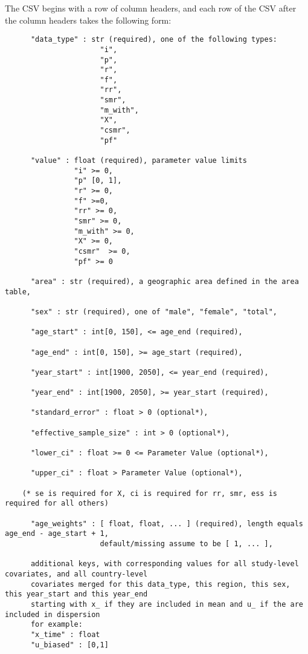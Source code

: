 The CSV begins with a row of column headers, and each row of the CSV after the column headers takes the following form:
\begin{verbatim}
      "data_type" : str (required), one of the following types:
                      "i",
                      "p",
                      "r",
                      "f",
                      "rr",
                      "smr",
                      "m_with",
                      "X",
                      "csmr",
                      "pf"

      "value" : float (required), parameter value limits
                "i" >= 0,
                "p" [0, 1],
                "r" >= 0,
                "f" >=0,
                "rr" >= 0,
                "smr" >= 0,
                "m_with" >= 0,
                "X" >= 0,
                "csmr"  >= 0,
                "pf" >= 0

      "area" : str (required), a geographic area defined in the area table,

      "sex" : str (required), one of "male", "female", "total",

      "age_start" : int[0, 150], <= age_end (required),

      "age_end" : int[0, 150], >= age_start (required),

      "year_start" : int[1900, 2050], <= year_end (required),

      "year_end" : int[1900, 2050], >= year_start (required),

      "standard_error" : float > 0 (optional*),

      "effective_sample_size" : int > 0 (optional*),

      "lower_ci" : float >= 0 <= Parameter Value (optional*),
      
      "upper_ci" : float > Parameter Value (optional*),

    (* se is required for X, ci is required for rr, smr, ess is required for all others)

      "age_weights" : [ float, float, ... ] (required), length equals age_end - age_start + 1,
                      default/missing assume to be [ 1, ... ],

      additional keys, with corresponding values for all study-level covariates, and all country-level   
      covariates merged for this data_type, this region, this sex, this year_start and this year_end
      starting with x_ if they are included in mean and u_ if the are included in dispersion
      for example:
      "x_time" : float
      "u_biased" : [0,1]
\end{verbatim}


